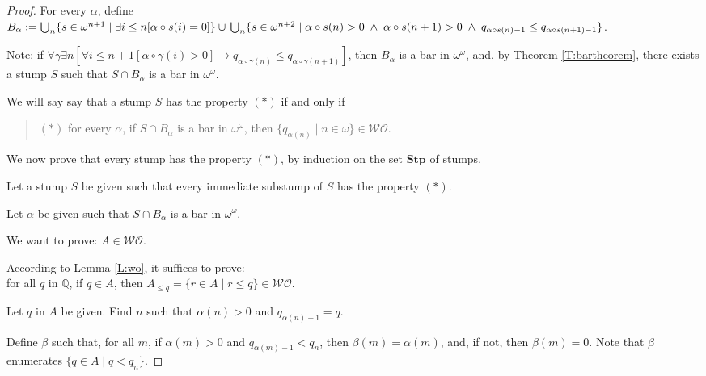 \documentclass[a4paper]{amsart}
\theoremstyle{plain}
\begin{document}
 \begin{proof} For every $\alpha$,  define $B_\alpha:=\bigcup_n \{s\in \omega^{n+1} \mid \exists i \le n [\alpha\circ s (i)=0]\} \cup \\\bigcup_n\{s\in \omega^{n+2}\mid \alpha\circ s(n)>0\;\wedge\;\alpha\circ s(n+1) >0   \;\wedge\;  q_{\alpha\circ s(n)-1}\le q_{\alpha\circ s(n+1)-1}\}$. 
  
  \smallskip Note: if $\forall \gamma\exists n[\forall i\le n+1[\alpha\circ\gamma(i)>0]\rightarrow q_{\alpha\circ\gamma(n)}\le q_{\alpha\circ\gamma(n+1)}]$, then $B_\alpha$ is a bar in $\omega^\omega$, and, by Theorem \ref{T:bartheorem}, there exists a stump $S$ such that $S\cap B_\alpha$ is a bar in $\omega^\omega$.
  
 \smallskip We will say say that a stump $S$ has the property $(\ast)$ if and only if \begin{quote} 
 
 $(\ast)$ for every $\alpha$, if $S\cap B_\alpha$ is a bar in $\omega^\omega$,  then $\{q_{\alpha(n)}\mid n \in \omega\}\in \mathcal{WO}$. \end{quote}
 
 We now prove that every stump has the property $(\ast)$,  by induction on the set $\mathbf{Stp}$ of stumps.
 
 
 
 \smallskip Let a  stump $S$ be given such that every immediate substump of $S$ has the property $(\ast)$. 
 
 Let $\alpha$ be given such that $S\cap B_\alpha$ is a bar in $\omega^\omega$. 
 
 We want to prove: $A\in \mathcal{WO}$. 
 
 According to Lemma \ref{L:wo}, it suffices to prove: \\for all  $q$ in $\mathbb{Q}$, if $q \in A$, then $A_{\le q}=\{r\in A\mid r\le q\}\in \mathcal{WO}$. 

 \smallskip Let $q$ in $A$ be given. Find $n$ such that $\alpha(n)>0$ and $q_{\alpha(n)-1}=q$. 
 
   Define $\beta$ such that, for all $m$, if $\alpha(m)>0$ and $q_{\alpha(m)-1}<q_n$, then $\beta(m)=\alpha(m)$, and, if not, then $\beta(m)= 0$. Note that $\beta$ enumerates $\{q\in A\mid q<q_n\}$. 
   

\end{proof}
\end{document}
